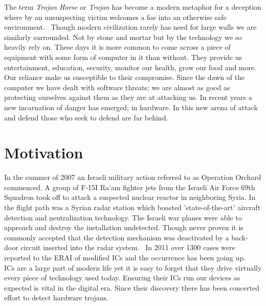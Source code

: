 \label{chapter:introduction}
The term \textit{Trojan Horse} or \textit{Trojan} has become a modern metaphor for a deception where by an unsuspecting victim welcomes a foe into an otherwise safe environment.~\cite{searchForTrojanWar}
Though modern civilization rarely has need for large walls we are similarly surrounded.
Not by stone and mortar but by the technology we so heavily rely on.
These days it is more common to come across a piece of equipment with some form of computer in it than without.
They provide us entertainment, education, security, monitor our health, grow our food and more.
Our reliance make us susceptible to their compromise.
Since the dawn of the computer we have dealt with software threats; we are almost as good as protecting ourselves against them as they are at attacking us.
In recent years a new incarnation of danger has emerged; in hardware.
In this new arena of attack and defend those who seek to defend are far behind.

\section{Motivation}
In the summer of 2007 an Israeli military action referred to as Operation Orchard commenced.
A group of F-15I Ra'am fighter jets from the Israeli Air Force 69th Squadron took off to attack a suspected nuclear reactor in neighboring Syria.
In the flight path was a Syrian radar station which boasted 'state-of-the-art' aircraft detection and neutralization technology. 
The Israeli war planes were able to approach and destroy the installation undetected.
Though never proven it is commonly accepted that the detection mechanism was deactivated by a back-door circuit inserted into the radar system.~\cite{stoppingHTsIEEESpectrum}
In 2011 over 1300 cases were reported to the \acrfull{ERAI} of modified \acrshort{IC}s and the occurrence has been going up.~\cite{counterfeitIEEESpectrum}
\acrfull{ICs} are a large part of modern life yet it is easy to forget that they drive virtually every piece of technology used today.
Ensuring their \acrshort{IC}s run our devices as expected is vital in the digital era.
Since their discovery there has been concerted effort to detect hardware trojans.~\cite{hardwareTrojanSurvey2015}

